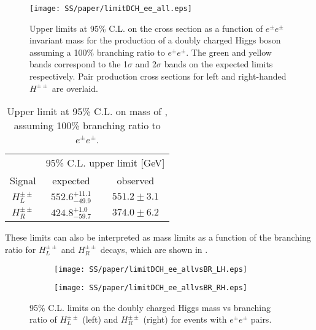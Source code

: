 \begin{figure}[h]
\begin{center}
\texttt{[image: SS/paper/limitDCH\_ee\_all.eps]}
\caption{Upper limits at 95\% C.L. on the cross section as a function of $e^{\pm}e^{\pm}$ invariant mass for the production of a doubly charged Higgs boson 
assuming a 100\% branching ratio to $e^{\pm}e^{\pm}$. The green and yellow bands correspond to the 1$\sigma$ and 2$\sigma$ bands on the expected limits respectively.
Pair production cross sections for left and right-handed $H^{\pm\pm}$ are overlaid.}
\label{fig:dch_limits_mass}
\end{center}
\end{figure}

\begin{table}[htbp]
\begin{center}
\begin{tabular}{c||c|c}
& \multicolumn{2}{c}{95\%  C.L. upper limit [GeV]}\\
Signal & expected & observed \\
\hline
$H^{\pm\pm}_L$ & $552.6^{+11.1}_{-49.9}$ & $551.2 \pm 3.1$ \\
\hline
$H^{\pm\pm}_R$ & $424.8^{+1.0}_{-59.7}$ & $374.0 \pm 6.2$ \\
\end{tabular}
\end{center}
\caption{Upper limit at 95\% C.L. on mass of \dch, assuming 100\% branching ratio to $e^{\pm}e^{\pm}$.}
\label{tab:limits_mass}
\end{table}

These limits can also be interpreted as mass limits as a function of the branching ratio for $H^{\pm\pm}_L$ and $H^{\pm\pm}_R$ decays, which are shown in .

\begin{figure}
\begin{subfigure}{.5\textwidth}
  \centering
  \texttt{[image: SS/paper/limitDCH\_ee\_allvsBR\_LH.eps]}
\end{subfigure}%
\begin{subfigure}{.5\textwidth}
  \centering
  \texttt{[image: SS/paper/limitDCH\_ee\_allvsBR\_RH.eps]}
\end{subfigure}
\caption{95\% C.L. limits on the doubly charged Higgs mass vs 
branching ratio of $H^{\pm\pm}_L$ (left) and $H^{\pm\pm}_R$ (right) for events with $e^{\pm}e^{\pm}$ pairs.}
  \label{fig:dch_limits_BR}
\end{figure}

